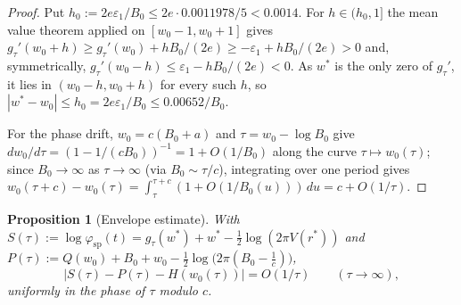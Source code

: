 \documentclass[11pt]{article}
\newtheorem{proposition}[theorem]{Proposition}
\theoremstyle{definition}
\theoremstyle{remark}
\begin{document}
\begin{proof}
Put $h_0 := 2e\varepsilon_1/B_0 \le 2e\cdot0.0011978/5 < 0.0014$. For $h\in(h_0,1]$ the mean value
theorem applied on $[w_0-1,w_0+1]$ gives $g_\tau'(w_0+h) \ge g_\tau'(w_0)+hB_0/(2e) \ge
-\varepsilon_1 + hB_0/(2e) > 0$ and, symmetrically, $g_\tau'(w_0-h) \le \varepsilon_1-hB_0/(2e) <
0$. As $w^*$ is the only zero of $g_\tau'$, it lies in $(w_0-h,w_0+h)$ for every such $h$, so
$|w^*-w_0| \le h_0 = 2e\varepsilon_1/B_0 \le 0.00652/B_0$.

For the phase drift, $w_0=c(B_0+a)$ and $\tau=w_0-\log B_0$ give $dw_0/d\tau = (1-1/(cB_0))^{-1} =
1+O(1/B_0)$ along the curve $\tau\mapsto w_0(\tau)$; since $B_0\to\infty$ as $\tau\to\infty$ (via
$B_0\sim\tau/c$), integrating over one period gives $w_0(\tau+c)-w_0(\tau) =
\int_\tau^{\tau+c}(1+O(1/B_0(u)))\,du = c+O(1/\tau)$.
\end{proof}

\begin{proposition}[Envelope estimate]
\label{prop:envelope}
With $S(\tau) := \log\varphi_{\mathrm{sp}}(t) = g_\tau(w^*)+w^*-\tfrac12\log(2\pi V(r^*))$ and
$P(\tau) := Q(w_0)+B_0+w_0-\tfrac12\log\bigl(2\pi(B_0-\tfrac1c)\bigr)$,
\[
|S(\tau) - P(\tau) - H(w_0(\tau))| = O(1/\tau) \qquad (\tau\to\infty),
\]
uniformly in the phase of $\tau$ modulo $c$.
\end{proposition}
\end{document}
